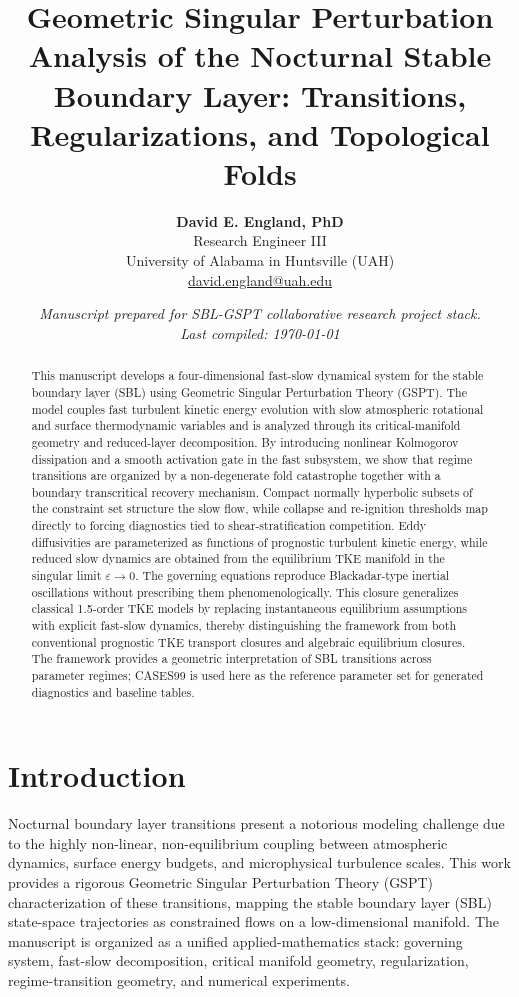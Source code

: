 \documentclass[11pt,letterpaper]{article}
\title{\textbf{Geometric Singular Perturbation Analysis of the Nocturnal Stable Boundary Layer: Transitions, Regularizations, and Topological Folds}}
\author{
    \textbf{David E. England, PhD} \\
    \small Research Engineer III \\
    \small University of Alabama in Huntsville (UAH) \\
    \small \href{mailto:david.england@uah.edu}{david.england@uah.edu}
}
\date{\small\itshape Manuscript prepared for SBL-GSPT collaborative research project stack. \\ Last compiled: \today}
\begin{document}
\maketitle

\begin{abstract}
This manuscript develops a four-dimensional fast-slow dynamical system for the stable boundary layer (SBL) using Geometric Singular Perturbation Theory (GSPT). The model couples fast turbulent kinetic energy evolution with slow atmospheric rotational and surface thermodynamic variables and is analyzed through its critical-manifold geometry and reduced-layer decomposition. By introducing nonlinear Kolmogorov dissipation and a smooth activation gate in the fast subsystem, we show that regime transitions are organized by a non-degenerate fold catastrophe together with a boundary transcritical recovery mechanism. Compact normally hyperbolic subsets of the constraint set structure the slow flow, while collapse and re-ignition thresholds map directly to forcing diagnostics tied to shear-stratification competition. Eddy diffusivities are parameterized as functions of prognostic turbulent kinetic energy, while reduced slow dynamics are obtained from the equilibrium TKE manifold in the singular limit $\varepsilon\to 0$. The governing equations reproduce Blackadar-type inertial oscillations without prescribing them phenomenologically. This closure generalizes classical 1.5-order TKE models by replacing instantaneous equilibrium assumptions with explicit fast-slow dynamics, thereby distinguishing the framework from both conventional prognostic TKE transport closures and algebraic equilibrium closures. The framework provides a geometric interpretation of SBL transitions across parameter regimes; CASES99 is used here as the reference parameter set for generated diagnostics and baseline tables.
\end{abstract}


\section{Introduction}
\label{sec:introduction}
Nocturnal boundary layer transitions present a notorious modeling challenge due to the highly non-linear, non-equilibrium coupling between atmospheric dynamics, surface energy budgets, and microphysical turbulence scales. This work provides a rigorous Geometric Singular Perturbation Theory (GSPT) characterization of these transitions, mapping the stable boundary layer (SBL) state-space trajectories as constrained flows on a low-dimensional manifold.
The manuscript is organized as a unified applied-mathematics stack: governing system, fast-slow decomposition, critical manifold geometry, regularization, regime-transition geometry, and numerical experiments.
\end{document}

